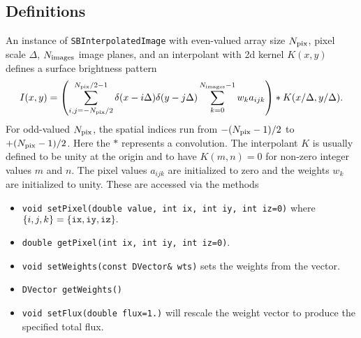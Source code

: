 \documentclass[11pt,preprint,flushrt]{aastex}
\begin{document}
\subsection{Definitions}
An instance of {\tt SBInterpolatedImage} with even-valued array size $N_{\rm pix}$, pixel scale $\Delta$, $N_{\rm images}$ image planes, and an interpolant with 2d kernel $K(x,y)$ defines a surface brightness pattern
\begin{equation}
\label{sbpix1}
I(x,y) = \left( \sum_{i,j=-N_{\rm pix}/2}^{N_{\rm pix}/2-1} \delta(x-i\Delta)\delta(y-j\Delta)
\sum_{k=0}^{N_{\rm images}-1} w_ka_{ijk} \right) \ast K( x/\Delta, y/\Delta).
\end{equation}
For odd-valued $N_{\rm pix}$, the spatial indices run from $-(N_{\rm pix}-1)/2$ to $+(N_{\rm pix}-1)/2$.
Here the $\ast$ represents a convolution.  The interpolant $K$ is usually defined to be unity at the origin and to have $K(m,n)=0$ for non-zero integer values $m$ and $n$.  The pixel values $a_{ijk}$ are initialized to zero and the weights $w_k$ are initialized to unity.  These are accessed via the methods
\begin{itemize}
\item {\tt void setPixel(double value, int ix, int iy, int iz=0)} where $\{i,j,k\}=\{ {\tt ix,iy,iz} \}.$
\item {\tt double getPixel(int ix, int iy, int iz=0)}. 
\item {\tt void setWeights(const DVector\& wts)} sets the weights from the vector.
\item {\tt DVector getWeights()}
\item {\tt void setFlux(double flux=1.)} will rescale the weight vector to produce the specified total flux.
\end{itemize}
\end{document}
